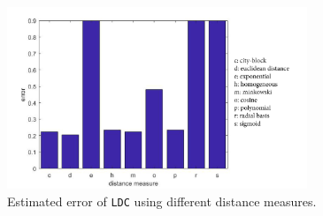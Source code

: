 \begin{figure}[H]
	\centering
	\includegraphics[width = 0.8\textwidth]{images/dissim_bar_dist_legend.jpg}
	\caption{Estimated error of \texttt{LDC} using different distance measures.}
	\label{fig:dissim_bar_dist}
\end{figure}

